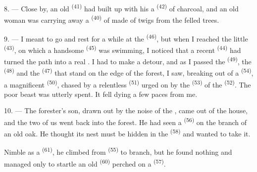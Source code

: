 8. --- Close by, an old  \textsuperscript{(41)} had built up
with his  a  \textsuperscript{(42)} of charcoal, and an
old woman was carrying away a  \textsuperscript{(40)} of
 made of twigs from the felled trees.

\VUsaut{3.0mm}
\VUsaut{3.0mm}

9. --- I meant to go and rest for a while at the 
\textsuperscript{(46)}, but when I reached the little  \textsuperscript{(43)},
on which a handsome  \textsuperscript{(45)} was swimming, I noticed that
a recent  \textsuperscript{(44)} had turned the path into a real
. I had to make a detour, and as I passed the 
\textsuperscript{(49)}, the  \textsuperscript{(48)} and the 
\textsuperscript{(47)} that stand on the edge of the forest, I saw, breaking out of a
 \textsuperscript{(54)}, a magnificent 
\textsuperscript{(50)}, chased by a relentless  \textsuperscript{(51)} urged on by
the  \textsuperscript{(53)} of the 
\textsuperscript{(52)}. The poor beast was utterly spent. It fell dying a few paces
from me.

10. --- The forester's son, drawn out by the noise of the , came
out of the house, and the two of us went back into the forest. He had
seen a  \textsuperscript{(56)} on the branch of an old oak. He thought
its nest must be hidden in the  \textsuperscript{(58)} and wanted to
take it.

Nimble as a  \textsuperscript{(61)}, he climbed from 
\textsuperscript{(55)} to branch, but he found nothing and managed only to startle
an old  \textsuperscript{(60)} perched on a 
\textsuperscript{(57)}.
\VUsaut{4.0mm}
\VUfilet{22mm}
